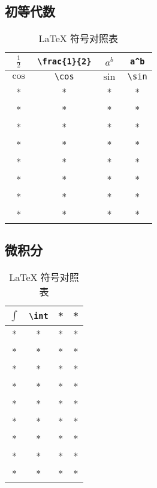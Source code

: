 
\subsection{初等代数}
\begin{table}[ht]
\centering
\caption{LaTeX 符号对照表}\label{tab_TeXSym0}
\begin{tabular}{|c|c|c|c|}
\hline
$\frac{1}{2}$ & \verb|\frac{1}{2}| & $a^b$ & \verb|a^b| \\
\hline
$\cos$ & \verb|\cos| & $\sin$ & \verb|\sin| \\
\hline
* & * & * & * \\
\hline
* & * & * & * \\
\hline
* & * & * & * \\
\hline
* & * & * & * \\
\hline
* & * & * & * \\
\hline
* & * & * & * \\
\hline
* & * & * & * \\
\hline
* & * & * & * \\
\hline
\end{tabular}
\end{table}


\subsection{微积分}
\begin{table}[ht]
\centering
\caption{LaTeX 符号对照表}\label{tab_TeXSym1}
\begin{tabular}{|c|c|c|c|}
\hline
$\int$ & \verb|\int| & * & * \\
\hline
* & * & * & * \\
\hline
* & * & * & * \\
\hline
* & * & * & * \\
\hline
* & * & * & * \\
\hline
* & * & * & * \\
\hline
* & * & * & * \\
\hline
* & * & * & * \\
\hline
* & * & * & * \\
\hline
* & * & * & * \\
\hline
\end{tabular}
\end{table}
